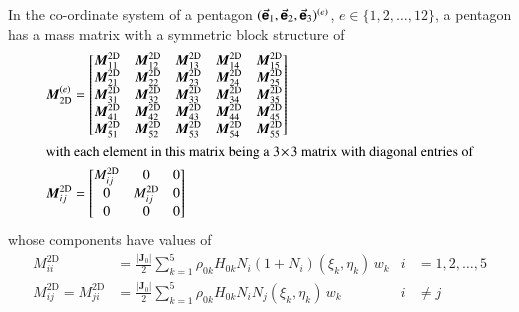 In the co-ordinate system of a pentagon $( \vec{\boldsymbol{\mathsf{e}}}_1 , \vec{\boldsymbol{\mathsf{e}}}_2 , \vec{\boldsymbol{\mathsf{e}}}_3  )^{(e)}$, $e \in \{ 1, 2, \ldots, 12 \}$, a pentagon has a mass matrix with a symmetric block structure of
\begin{subequations}
    \begin{align}
    \boldsymbol{M}^{(e)}_{\mathrm{2D}} & = 
    \begin{bmatrix}
    \boldsymbol{M}^{\mathrm{2D}}_{11} & \boldsymbol{M}^{\mathrm{2D}}_{12} & 
    \boldsymbol{M}^{\mathrm{2D}}_{13} & \boldsymbol{M}^{\mathrm{2D}}_{14} & 
    \boldsymbol{M}^{\mathrm{2D}}_{15} \\
    \boldsymbol{M}^{\mathrm{2D}}_{21} & \boldsymbol{M}^{\mathrm{2D}}_{22} & 
    \boldsymbol{M}^{\mathrm{2D}}_{23} & \boldsymbol{M}^{\mathrm{2D}}_{24} & 
    \boldsymbol{M}^{\mathrm{2D}}_{25} \\
    \boldsymbol{M}^{\mathrm{2D}}_{31} & \boldsymbol{M}^{\mathrm{2D}}_{32} & 
    \boldsymbol{M}^{\mathrm{2D}}_{33} & \boldsymbol{M}^{\mathrm{2D}}_{34} & 
    \boldsymbol{M}^{\mathrm{2D}}_{35} \\
    \boldsymbol{M}^{\mathrm{2D}}_{41} & \boldsymbol{M}^{\mathrm{2D}}_{42} & 
    \boldsymbol{M}^{\mathrm{2D}}_{43} & \boldsymbol{M}^{\mathrm{2D}}_{44} & 
    \boldsymbol{M}^{\mathrm{2D}}_{45} \\ 
    \boldsymbol{M}^{\mathrm{2D}}_{51} & \boldsymbol{M}^{\mathrm{2D}}_{52} & 
    \boldsymbol{M}^{\mathrm{2D}}_{53} & \boldsymbol{M}^{\mathrm{2D}}_{54} & 
    \boldsymbol{M}^{\mathrm{2D}}_{55}
    \end{bmatrix} \\
    \intertext{with each element in this matrix being a $3 \! \times \! 3$ matrix with diagonal entries of}
    \boldsymbol{M}^{\mathrm{2D}}_{ij} & = 
    \begin{bmatrix}
    M^{\mathrm{2D}}_{ij} & 0 & 0 \\
    0 & M^{\mathrm{2D}}_{ij} & 0 \\
    0 & 0 & 0
    \end{bmatrix}
    \end{align}
\end{subequations}
whose components have values of
\begin{subequations}
    \begin{align}
    M_{ii}^{\mathrm{2D}} & = 
    \frac{| \mathbf{J}_0 |}{2} \sum_{k=1}^5 \rho_{0k} H_{0k} N_i ( 1 + 
    N_i ) ( \xi_k , \eta_k ) \, w_k & i & = 1,2,\ldots,5 \\
    M_{ij}^{\mathrm{2D}} = M_{ji}^{\mathrm{2D}} & =
    \frac{| \mathbf{J}_0 |}{2} \sum_{k=1}^5 \rho_{0k} H_{0k}
    N_i N_j (\xi_k , \eta_k ) \, w_k & i & \neq j
    \end{align}
\end{subequations}
